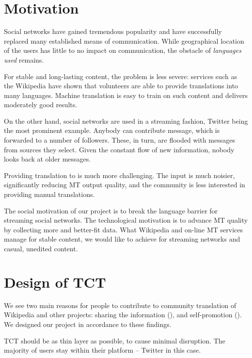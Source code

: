 \documentclass[11pt]{article}
\begin{document}
\section{Motivation}
\label{motiv}

Social networks have gained tremendous popularity and 
have successfully replaced many established means of communication. 
While geographical location of the users has little to no impact on 
communication, the obstacle of \emph{languages used} remains.

For stable and long-lasting content, the problem is less severe:
services such as the Wikipedia have shown that
volunteers are able to provide translations into many languages. 
Machine translation is easy to train on such
content and delivers moderately good results.

On the other hand, social networks are used in a streaming fashion, Twitter
being the most prominent example. Anybody can contribute message, 
which is forwarded to a number of followers. These, in turn, are flooded 
with messages from sources they select. Given the constant flow
of new information, nobody looks back at older messages.

Providing translation to  is much more challenging.
The input is much noisier, significantly reducing MT output quality, and the
community is less interested in providing manual translations.

The social motivation of our project is to break the language
barrier for streaming social networks. The technological motivation is to
advance MT quality by collecting more and better-fit data.
What Wikipedia and on-line MT services manage for stable content,
we would like to achieve for streaming networks and casual, unedited content.

\section{Design of TCT}
\label{design}

We see two main reasons for people to 
contribute to community translation of Wikipedia and other projects: sharing the information 
(), 
and self-promotion
().
We designed our project in accordance to these findings.

TCT should be as thin layer as possible, to cause 
minimal disruption. 
The majority of users stay within their platform -- Twitter in this
case.
\end{document}
